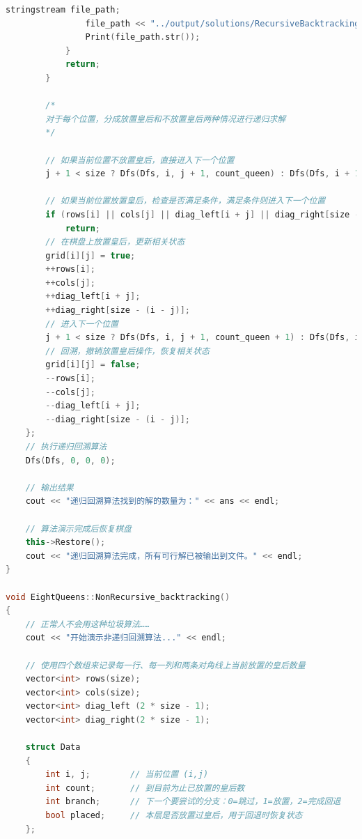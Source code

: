 \documentclass[12pt, a4paper, oneside]{ctexart}
\begin{document}
\begin{lstlisting}[language=C++, breaklines=true]
				stringstream file_path; 
				file_path << "../output/solutions/RecursiveBacktracking/" << setw(3) << setfill('0') << ans << ".txt";
				Print(file_path.str());
			}
			return;
		}

		/*
		对于每个位置，分成放置皇后和不放置皇后两种情况进行递归求解
		*/

		// 如果当前位置不放置皇后，直接进入下一个位置
		j + 1 < size ? Dfs(Dfs, i, j + 1, count_queen) : Dfs(Dfs, i + 1, 0, count_queen);

		// 如果当前位置放置皇后，检查是否满足条件，满足条件则进入下一个位置
		if (rows[i] || cols[j] || diag_left[i + j] || diag_right[size - (i - j)])
			return;
		// 在棋盘上放置皇后，更新相关状态
		grid[i][j] = true;
		++rows[i];
		++cols[j];
		++diag_left[i + j];
		++diag_right[size - (i - j)];
		// 进入下一个位置
		j + 1 < size ? Dfs(Dfs, i, j + 1, count_queen + 1) : Dfs(Dfs, i + 1, 0, count_queen + 1);
		// 回溯，撤销放置皇后操作，恢复相关状态
		grid[i][j] = false;
		--rows[i];
		--cols[j];
		--diag_left[i + j];
		--diag_right[size - (i - j)];
	};
	// 执行递归回溯算法
	Dfs(Dfs, 0, 0, 0);

	// 输出结果
	cout << "递归回溯算法找到的解的数量为：" << ans << endl;

	// 算法演示完成后恢复棋盘
	this->Restore();
	cout << "递归回溯算法完成，所有可行解已被输出到文件。" << endl;
}

void EightQueens::NonRecursive_backtracking()
{
	// 正常人不会用这种垃圾算法……
	cout << "开始演示非递归回溯算法..." << endl;

	// 使用四个数组来记录每一行、每一列和两条对角线上当前放置的皇后数量
	vector<int> rows(size);
	vector<int> cols(size);
	vector<int> diag_left (2 * size - 1);
	vector<int> diag_right(2 * size - 1);

	struct Data 
	{
	    int i, j;        // 当前位置 (i,j)
	    int count;       // 到目前为止已放置的皇后数
	    int branch;      // 下一个要尝试的分支：0=跳过，1=放置，2=完成回退
	    bool placed;     // 本层是否放置过皇后，用于回退时恢复状态
	};


\end{lstlisting}
\end{document}
